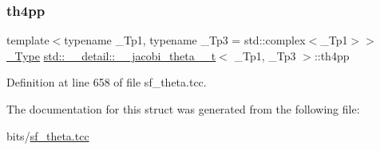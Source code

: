 \subsubsection{\texorpdfstring{th4pp}{th4pp}}
{\footnotesize\ttfamily template$<$typename \+\_\+\+Tp1, typename \+\_\+\+Tp3 = std\+::complex$<$\+\_\+\+Tp1$>$$>$ \\
\hyperlink{structstd_1_1____detail_1_1____jacobi__theta__0__t_a4aebcbdd8f3ab416a2fa770aa3784d63}{\+\_\+\+Type} \hyperlink{structstd_1_1____detail_1_1____jacobi__theta__0__t}{std\+::\+\_\+\+\_\+detail\+::\+\_\+\+\_\+jacobi\+\_\+theta\+\_\+\_\+t}$<$ \+\_\+\+Tp1, \+\_\+\+Tp3 $>$\+::th4pp}



Definition at line 658 of file sf\+\_\+theta.\+tcc.



The documentation for this struct was generated from the following file\+:\begin{DoxyCompactItemize}
\item 
bits/\hyperlink{sf__theta_8tcc}{sf\+\_\+theta.\+tcc}\end{DoxyCompactItemize}
